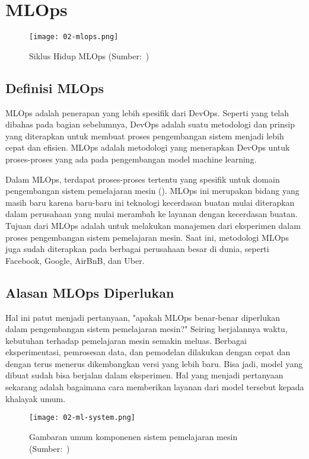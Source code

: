 \section{MLOps}

\begin{figure}[h]
  \centering
  \texttt{[image: 02-mlops.png]}
  \caption{Siklus Hidup MLOps (Sumber:~\cite{mlops})}
\end{figure}

\subsection{Definisi MLOps}

MLOps adalah penerapan yang lebih spesifik dari DevOps. 
Seperti yang telah dibahas pada bagian sebelumnya, DevOps adalah suatu metodologi dan prinsip yang diterapkan untuk membuat proses pengembangan sistem menjadi lebih cepat dan efisien.
MLOps adalah metodologi yang menerapkan DevOps untuk proses-proses yang ada pada pengembangan model machine learning.

Dalam MLOps, terdapat proses-proses tertentu yang spesifik untuk domain pengembangan sistem pemelajaran mesin (\cite{mlops}).\@
MLOps ini merupakan bidang yang masih baru karena baru-baru ini teknologi kecerdasan buatan mulai diterapkan dalam perusahaan yang mulai merambah ke layanan dengan kecerdasan buatan.
Tujuan dari MLOps adalah untuk melakukan manajemen dari eksperimen dalam proses pengembangan sistem pemelajaran mesin.
Saat ini, metodologi MLOps juga sudah diterapkan pada berbagai perusahaan besar di dunia, seperti Facebook, Google, AirBnB, dan Uber.

\subsection{Alasan MLOps Diperlukan}

Hal ini patut menjadi pertanyaan, "apakah MLOps benar-benar diperlukan dalam pengembangan sistem pemelajaran mesin?"
Seiring berjalannya waktu, kebutuhan terhadap pemelajaran mesin semakin meluas.
Berbagai eksperimentasi, pemrosesan data, dan pemodelan dilakukan dengan cepat dan dengan terus menerus dikembangkan versi yang lebih baru.
Bisa jadi, model yang dibuat sudah bisa berjalan dalam eksperimen.
Hal yang menjadi pertanyaan sekarang adalah bagaimana cara memberikan layanan dari model tersebut kepada khalayak umum.

\begin{figure}[ht]
  \centering
  \texttt{[image: 02-ml-system.png]}
  \captionsetup{justification=centering}
  \caption{Gambaran umum komponenen sistem pemelajaran mesin (Sumber:~\cite{NIPS2015_86df7dcf})}\label{fig:ml-system}
\end{figure}


